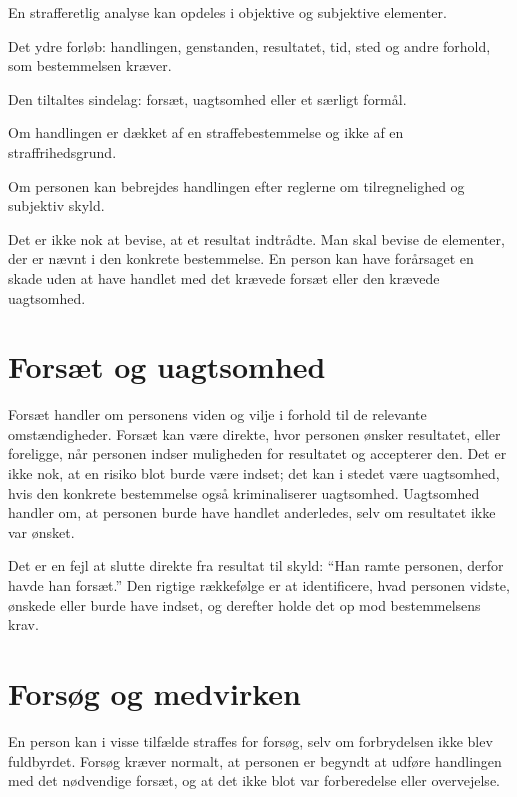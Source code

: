 En strafferetlig analyse kan opdeles i objektive og subjektive elementer.

\begin{description}[style=nextline,leftmargin=0pt,labelindent=0pt]
  \item[Objektive elementer] Det ydre forløb: handlingen, genstanden, resultatet, tid, sted og andre forhold, som bestemmelsen kræver.
  \item[Subjektive elementer] Den tiltaltes sindelag: forsæt, uagtsomhed eller et særligt formål.
  \item[Ulovlighed] Om handlingen er dækket af en straffebestemmelse og ikke af en straffrihedsgrund.
  \item[Skyld] Om personen kan bebrejdes handlingen efter reglerne om tilregnelighed og subjektiv skyld.
\end{description}

Det er ikke nok at bevise, at et resultat indtrådte. Man skal bevise de elementer, der er nævnt i den konkrete bestemmelse. En person kan have forårsaget en skade uden at have handlet med det krævede forsæt eller den krævede uagtsomhed.

\section{Forsæt og uagtsomhed}

Forsæt handler om personens viden og vilje i forhold til de relevante omstændigheder. Forsæt kan være direkte, hvor personen ønsker resultatet, eller foreligge, når personen indser muligheden for resultatet og accepterer den. Det er ikke nok, at en risiko blot burde være indset; det kan i stedet være uagtsomhed, hvis den konkrete bestemmelse også kriminaliserer uagtsomhed. Uagtsomhed handler om, at personen burde have handlet anderledes, selv om resultatet ikke var ønsket.

Det er en fejl at slutte direkte fra resultat til skyld: ``Han ramte personen, derfor havde han forsæt.'' Den rigtige rækkefølge er at identificere, hvad personen vidste, ønskede eller burde have indset, og derefter holde det op mod bestemmelsens krav.

\section{Forsøg og medvirken}

En person kan i visse tilfælde straffes for forsøg, selv om forbrydelsen ikke blev fuldbyrdet. Forsøg kræver normalt, at personen er begyndt at udføre handlingen med det nødvendige forsæt, og at det ikke blot var forberedelse eller overvejelse.

